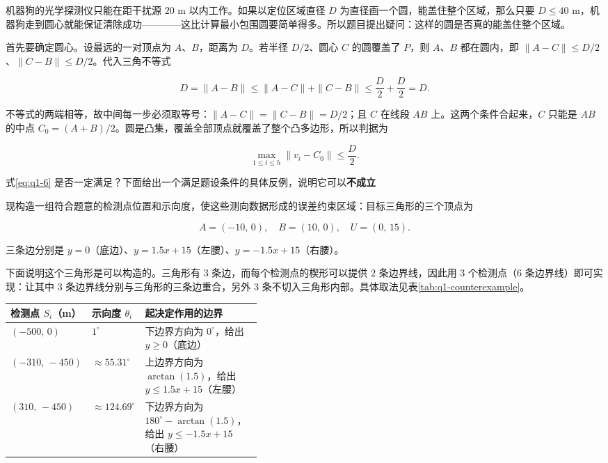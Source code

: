机器狗的光学探测仪只能在距干扰源 $20$ m 以内工作。如果以定位区域直径 $D$ 为直径画一个圆，能盖住整个区域，那么只要 $D\le40$ m，机器狗走到圆心就能保证清除成功————这比计算最小包围圆要简单得多。所以题目提出疑问：这样的圆是否真的能盖住整个区域。

首先要确定圆心。设最远的一对顶点为 $A$、$B$，距离为 $D$。若半径 $D/2$、圆心 $C$ 的圆覆盖了 $P$，则 $A$、$B$ 都在圆内，即 $\|A-C\|\le D/2$、$\|C-B\|\le D/2$。代入三角不等式

\[
D=\|A-B\|\le\|A-C\|+\|C-B\|\le\frac D2+\frac D2=D .
\]

不等式的两端相等，故中间每一步必须取等号：$\|A-C\|=\|C-B\|=D/2$；且 $C$ 在线段 $AB$ 上。这两个条件合起来，$C$ 只能是 $AB$ 的中点 $C_0=(A+B)/2$。圆是凸集，覆盖全部顶点就覆盖了整个凸多边形，所以判据为

\begin{equation}\label{eq:q1-6}
\max_{1\le i\le h}\|v_i-C_0\|\le\frac D2 .
\end{equation}

式\eqref{eq:q1-6} 是否一定满足？下面给出一个满足题设条件的具体反例，说明它可以\textbf{不成立}

现构造一组符合题意的检测点位置和示向度，使这些测向数据形成的误差约束区域：目标三角形的三个顶点为

\[
A=(-10,\,0),\quad B=(10,\,0),\quad U=(0,\,15).
\]

三条边分别是 $y=0$（底边）、$y=1.5x+15$（左腰）、$y=-1.5x+15$（右腰）。

下面说明这个三角形是可以构造的。三角形有 $3$ 条边，而每个检测点的楔形可以提供 $2$ 条边界线，因此用 $3$ 个检测点（$6$ 条边界线）即可实现：让其中 $3$ 条边界线分别与三角形的三条边重合，另外 $3$ 条不切入三角形内部。具体取法见表\ref{tab:q1-counterexample}。

\begin{center}
\begin{minipage}{\linewidth}
\centering
{}\label{tab:q1-counterexample}

\renewcommand{\arraystretch}{1.3}
\begin{tabularx}{0.98\linewidth}{>{\centering\arraybackslash}p{0.22\linewidth}>{\centering\arraybackslash}p{0.20\linewidth}>{\raggedright\arraybackslash}X}
\toprule
\textbf{检测点 $S_i$（m）} & \textbf{示向度 $\theta_i$} & \textbf{起决定作用的边界} \\
\midrule
$(-500,\,0)$ & $1^\circ$ & 下边界方向为 $0^\circ$，给出 $y\ge0$（底边） \\
$(-310,\,-450)$ & $\approx55.31^\circ$ & 上边界方向为 $\arctan(1.5)$，给出 $y\le1.5x+15$（左腰） \\
$(310,\,-450)$ & $\approx124.69^\circ$ & 下边界方向为 $180^\circ-\arctan(1.5)$，给出 $y\le-1.5x+15$（右腰） \\
\bottomrule
\end{tabularx}
\end{minipage}
\end{center}

